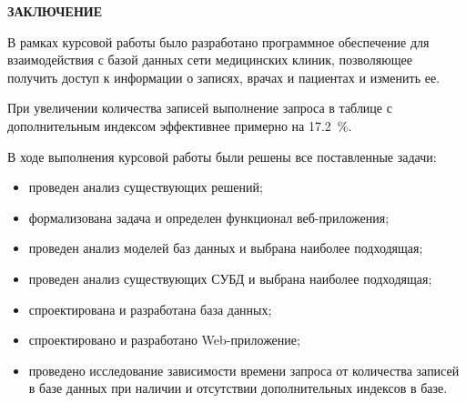 \begin{center}
	\textbf{\large ЗАКЛЮЧЕНИЕ}
\end{center}

В рамках курсовой работы было разработано программное обеспечение для взаимодействия с базой данных сети медицинских клиник, позволяющее получить доступ к информации о записях, врачах и пациентах и изменить ее.

При увеличении количества записей выполнение запроса в таблице с дополнительным индексом эффективнее примерно на 17.2~\%.

В ходе выполнения курсовой работы были решены все поставленные задачи:
\begin{itemize}
	\item проведен анализ существующих решений;
	\item формализована задача и определен функционал веб-приложения;
	\item проведен анализ моделей баз данных и выбрана наиболее подходящая;
	\item проведен анализ существующих СУБД и выбрана наиболее подходящая;
	\item спроектирована и разработана база данных;
	\item спроектировано и разработано Web-приложение;
	\item проведено исследование зависимости времени запроса от количества записей в базе данных при наличии и отсутствии дополнительных индексов в базе.
\end{itemize} 

